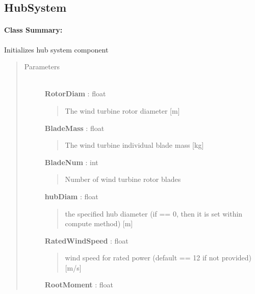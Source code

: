 \documentclass[letterpaper,10pt,openany,oneside]{sphinxmanual}
\begin{document}
\subsection{HubSystem}
\label{documentation:hubsystem}\label{documentation:hubsystem-class-label}\paragraph{Class Summary:}

\begin{fulllineitems}
\label{documentation:nacelleSE.src.hubSE.HubSystem}
Initializes hub system component
\begin{quote}\begin{description}
\item[{Parameters }] \leavevmode\\
\textbf{RotorDiam} : float
\begin{quote}

The wind turbine rotor diameter {[}m{]}
\end{quote}

\textbf{BladeMass} : float
\begin{quote}

The wind turbine individual blade mass {[}kg{]}
\end{quote}

\textbf{BladeNum} : int
\begin{quote}

Number of wind turbine rotor blades
\end{quote}

\textbf{hubDiam} : float
\begin{quote}

the specified hub diameter (if == 0, then it is set within compute method) {[}m{]}
\end{quote}

\textbf{RatedWindSpeed} : float
\begin{quote}

wind speed for rated power (default == 12 if not provided) {[}m/s{]}
\end{quote}

\textbf{RootMoment} : float
\begin{quote}


\end{quote}
\end{description}
\end{quote}
\end{fulllineitems}
\end{document}
